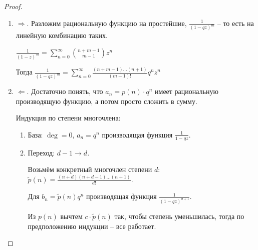 \begin{proof}
    \begin{enumerate}
        \item {
            $\Rightarrow$. Разложим рациональную функцию на простейшие, $\frac{1}{(1 - qz)^m}$ -- то есть на линейную комбинацию таких.

            $\frac{1}{(1 - z)^m} = \sum_{n = 0}^{\infty} \binom{n + m - 1}{m - 1} z^n$

            Тогда $\frac{1}{(1 - qz)^m} = \sum_{n = 0}^{\infty} \frac{(n + m - 1) \ldots (n + 1)}{(m - 1)!}q^nz^n$
        }
        \item {
            $\Leftarrow$. Достаточно понять, что $a_n = p(n) \cdot q^n$ имеет рациональную производящую функцию, а потом просто сложить в сумму.

            Индукция по степени многочлена:

            \begin{enumerate}
                \item {
                    База: $\deg = 0$, $a_n = q^n$ производящая функция $\frac{1}{1 - qz}$.
                }
                \item {
                    Переход: $d - 1 \rightarrow d$.

                    Возьмём конкретный многочлен степени $d$: $\tilde{p}(n) = \frac{(n + d)(n + d - 1) \ldots (n + 1)}{d!}$.

                    Для $b_n = \tilde{p}(n)q^n$ производящая функция $\frac{1}{(1 - qz)^{d + 1}}$.

                    Из $p(n)$ вычтем $c \cdot \tilde{p}(n)$ так, чтобы степень уменьшилась, тогда по предположению индукции -- все работает.
                }
            \end{enumerate}
        }
    \end{enumerate}
\end{proof}

